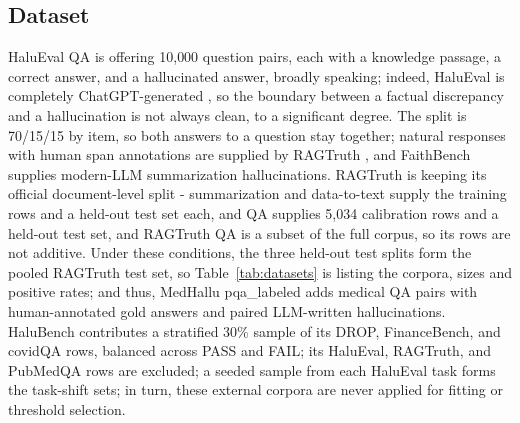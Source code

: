 \documentclass[a4paper,fleqn]{cas-sc}
\begin{document}
\subsection{Dataset}

HaluEval QA \cite{haluEval} is offering 10{,}000 question pairs, each with a knowledge passage, a correct answer, and a hallucinated answer, broadly speaking; indeed, HaluEval is completely ChatGPT-generated \cite{haluEval,bang-etal-2025-hallulens}, so the boundary between a factual discrepancy and a hallucination is not always clean, to a significant degree. The split is 70/15/15 by item, so both answers to a question stay together; natural responses with human span annotations are supplied by RAGTruth \cite{ragtruth}, and FaithBench \cite{faithbench} supplies modern-LLM summarization hallucinations. RAGTruth is keeping its official document-level split - summarization and data-to-text supply the training rows and a held-out test set each, and QA supplies 5{,}034 calibration rows and a held-out test set, and RAGTruth QA is a subset of the full corpus, so its rows are not additive. Under these conditions, the three held-out test splits form the pooled RAGTruth test set, so Table~\ref{tab:datasets} is listing the corpora, sizes and positive rates; and thus, MedHallu pqa\_labeled \cite{pandit2025medhallu} adds medical QA pairs with human-annotated gold answers and paired LLM-written hallucinations. HaluBench \cite{ravi2024lynx} contributes a stratified 30\% sample of its DROP, FinanceBench, and covidQA rows, balanced across PASS and FAIL; its HaluEval, RAGTruth, and PubMedQA rows are excluded; a seeded sample from each HaluEval task forms the task-shift sets; in turn, these external corpora are never applied for fitting or threshold selection.
\end{document}
